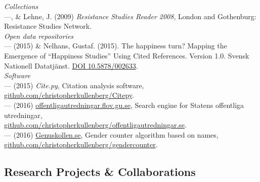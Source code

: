 \documentclass[a4paper,11pt,oneside]{article}
\begin{document}
    \noindent \emph{Collections}\\
      ---, \& Lehne, J. (2009) \emph{Resistance Studies Reader 2008}, London and Gothenburg: Resistance Studies Network.\\

    \noindent \emph{Open data repositories}\\
    --- (2015) \& Nelhans, Gustaf. (2015). The happiness turn? Mapping the
    Emergence of “Happiness Studies” Using Cited References. Version 1.0. Svensk
    Nationell Datatjänst. \href{http://dx.doi.org/10.5878/002633}{DOI 10.5878/002633}.
    \\

    \noindent \emph{Software}\\
    --- (2015) \emph{Cite.py}, Citation analysis software, \href{https://github.com/christopherkullenberg/Citepy}{github.com/christopherkullenberg/Citepy}.\\
    --- (2016) \href{http://offentligautredningar.flov.gu.se/}{offentligautredningar.flov.gu.se}, Search engine for Statens offentliga utredningar,\\ \href{https://github.com/christopherkullenberg/offentligautredningar.se}{github.com/christopherkullenberg/offentligautredningar.se}. \\
    --- (2016) \href{https://genuskollen.se}{Genuskollen.se}, Gender counter algorithm based on names,\\ \href{https://github.com/christopherkullenberg/gendercounter}{github.com/christopherkullenberg/gendercounter}. \\



\subsection{Research Projects \& Collaborations}
\end{document}
